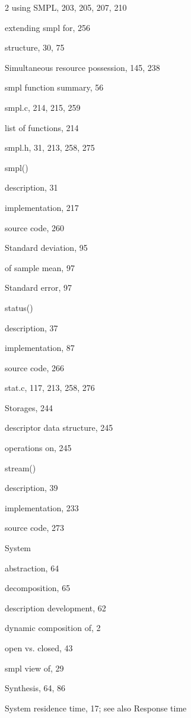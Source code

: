 \begin{multicols}{2}
\qquad using SMPL, 203, 205, 207, 210\par
\qquad extending smpl for, 256\par
\quad structure, 30, 75\par
\noindent Simultaneous resource possession, 145, 238\par
\noindent smpl function summary, 56\par
\noindent smpl.c, 214, 215, 259\par
\quad list of functions, 214\par
\noindent smpl.h, 31, 213, 258, 275\par
\noindent smpl()\par
\quad description, 31\par
\quad implementation, 217\par
\quad source code, 260\par
\noindent Standard deviation, 95\par
\quad of sample mean, 97\par
\columnbreak
\noindent Standard error, 97\par
\noindent status()\par
\quad description, 37\par
\quad implementation, 87\par
\quad source code, 266\par
\noindent stat.c, 117, 213, 258, 276\par
\noindent Storages, 244\par
\quad descriptor data structure, 245\par
\quad operations on, 245\par
\noindent stream()\par
\quad description, 39\par
\quad implementation, 233\par
\quad source code, 273\par
\noindent System\par
\quad abstraction, 64\par
\quad decomposition, 65\par
\quad description development, 62\par
\quad dynamic composition of, 2\par
\quad open vs. closed, 43\par
\quad smpl view of, 29\par
\noindent Synthesis, 64, 86\par
\noindent System residence time, 17; see also Response time\par

\end{multicols}
